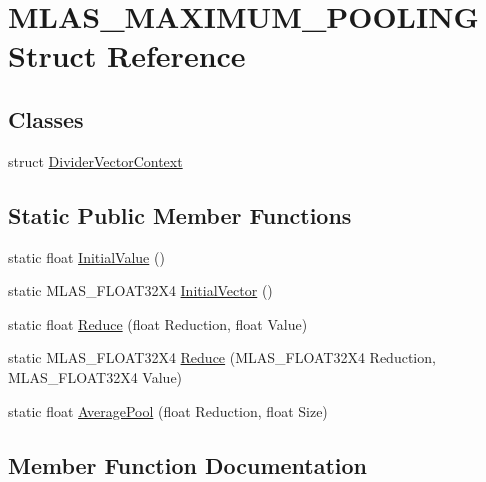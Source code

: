 \hypertarget{structMLAS__MAXIMUM__POOLING}{}\section{M\+L\+A\+S\+\_\+\+M\+A\+X\+I\+M\+U\+M\+\_\+\+P\+O\+O\+L\+I\+NG Struct Reference}
\label{structMLAS__MAXIMUM__POOLING}
\subsection*{Classes}
\begin{DoxyCompactItemize}
\item 
struct \mbox{\hyperlink{structMLAS__MAXIMUM__POOLING_1_1DividerVectorContext}{Divider\+Vector\+Context}}
\end{DoxyCompactItemize}
\subsection*{Static Public Member Functions}
\begin{DoxyCompactItemize}
\item 
static float \mbox{\hyperlink{structMLAS__MAXIMUM__POOLING_ad86d35c89bcdb13c6a88eb4f8577514c}{Initial\+Value}} ()
\item 
static M\+L\+A\+S\+\_\+\+F\+L\+O\+A\+T32\+X4 \mbox{\hyperlink{structMLAS__MAXIMUM__POOLING_ad924740c8eca5aea9713a99bac23a08b}{Initial\+Vector}} ()
\item 
static float \mbox{\hyperlink{structMLAS__MAXIMUM__POOLING_adfb12b4c29b631ca23c04812a2e98464}{Reduce}} (float Reduction, float Value)
\item 
static M\+L\+A\+S\+\_\+\+F\+L\+O\+A\+T32\+X4 \mbox{\hyperlink{structMLAS__MAXIMUM__POOLING_a77a25304cb2b0fa059ba3c806c4b2097}{Reduce}} (M\+L\+A\+S\+\_\+\+F\+L\+O\+A\+T32\+X4 Reduction, M\+L\+A\+S\+\_\+\+F\+L\+O\+A\+T32\+X4 Value)
\item 
static float \mbox{\hyperlink{structMLAS__MAXIMUM__POOLING_a25a0870fde3f4ecf06e85f3169c5c811}{Average\+Pool}} (float Reduction, float Size)
\end{DoxyCompactItemize}


\subsection{Member Function Documentation}
\mbox{\label{structMLAS__MAXIMUM__POOLING_a25a0870fde3f4ecf06e85f3169c5c811}} 
